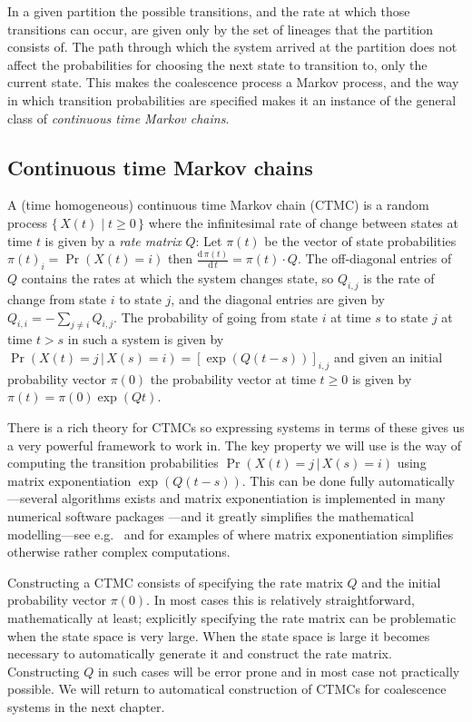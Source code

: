 In a given partition the possible transitions, and the rate at which those transitions can occur, are given only by the set of lineages that the partition consists of. The path through which the system arrived at the partition does not affect the probabilities for choosing the next state to transition to, only the current state. This makes the coalescence process a Markov process, and the way in which transition probabilities are specified makes it an instance of the general class of \emph{continuous time Markov chains}.


\subsection{Continuous time Markov chains}

A (time homogeneous) continuous time Markov chain (CTMC) is a random process $\{\,X(t) \;|\; t \geq 0 \,\}$ where the infinitesimal rate of change between states at time $t$ is given by a \emph{rate matrix} $Q$: Let $\pi(t)$ be the vector of state probabilities $\pi(t)_i = \Pr(X(t)=i)$ then $\frac{\mathrm{d}\,\pi(t)}{\mathrm{d}\,t} = \pi(t)\cdot Q$. The off-diagonal entries of $Q$ contains the rates at which the system changes state, so $Q_{i,j}$ is the rate of change from state $i$ to state $j$, and the diagonal entries are given by $Q_{i,i} = - \sum_{j\neq i} Q_{i,j}$. The probability of going from state $i$ at time $s$ to state $j$ at time $t>s$ in such a system is given by $\Pr(X(t)=j\,|\,X(s)=i) = \left[\exp\left(Q\left(t-s\right)\right)\right]_{i,j}$ and given an initial probability vector $\pi(0)$ the probability vector at time $t\geq 0$ is given by $\pi(t)=\pi(0)\exp(Qt)$.

There is a rich theory for CTMCs so expressing systems in terms of these gives us a very powerful framework to work in. The key property we will use is the way of computing the transition probabilities $\Pr(X(t)=j\,|\,X(s)=i)$ using matrix exponentiation $\exp\left(Q\left(t-s\right)\right)$. This can be done fully automatically---several algorithms exists and matrix exponentiation is implemented in many numerical software packages \cite{Moler2003}---and it greatly simplifies the mathematical modelling---see e.g.\ \citet{Hobolth:2011hl} and \citet{Andersen:2013iz} for examples of where matrix exponentiation simplifies otherwise rather complex computations.

Constructing a CTMC consists of specifying the rate matrix $Q$ and the initial probability vector $\pi(0)$. In most cases this is relatively straightforward, mathematically at least; explicitly specifying the rate matrix can be problematic when the state space is very large. When the state space is large it becomes necessary to automatically generate it and construct the rate matrix. Constructing $Q$ in such cases will be error prone and in most case not practically possible. We will return to automatical construction of CTMCs for coalescence systems in the next chapter.

